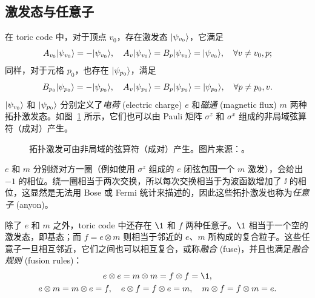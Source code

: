 \subsection{激发态与任意子}

在 toric code 中，对于顶点 $v_0$，存在激发态 $\ket*{\psi_{v_0}}$，它满足
\begin{equation}
  A_{v_0} \ket*{\psi_{v_0}} = -\ket*{\psi_{v_0}}, \quad
  A_v \ket*{\psi_{v_0}} = B_p \ket*{\psi_{v_0}} = \ket*{\psi_{v_0}}, \quad \forall v \neq v_0, p;
\end{equation}
同样，对于元格 $p_0$，也存在 $\ket*{\psi_{p_0}}$，满足
\begin{equation}
  B_{p_0} \ket*{\psi_{p_0}} = -\ket*{\psi_{p_0}}, \quad
  A_v \ket*{\psi_{p_0}} = B_p \ket*{\psi_{p_0}} = \ket*{\psi_{p_0}}, \quad \forall p \neq p_0, v.
\end{equation}
$\ket*{\psi_{v_0}}$ 和 $\ket*{\psi_{p_0}}$ 分别定义了\emph{电荷} (electric charge) $e$ 和\emph{磁通} (magnetic flux) $m$ 两种拓扑激发态。如图~\ref{fig:toric-code-string-operators} 所示，它们也可以由 Pauli 矩阵 $\sigma^z$ 和 $\sigma^x$ 组成的非局域弦算符（成对）产生。

\begin{figure}[htb]
  \centering
  \caption[弦算符产生拓扑激发]{拓扑激发可由非局域的弦算符（成对）产生。图片来源：\parencite{kong2022invitation}。}
  \label{fig:toric-code-string-operators}
\end{figure}

$e$ 和 $m$ 分别绕对方一圈（例如使用 $\sigma^z$ 组成的 $e$ 闭弦包围一个 $m$ 激发），会给出 $-1$ 的相位。绕一圈相当于两次交换，所以每次交换相当于为波函数增加了 $\ii$ 的相位，这显然是无法用 Bose 或 Fermi 统计来描述的，因此这些拓扑激发也称为\emph{任意子} (anyon)。

除了 $e$ 和 $m$ 之外，toric code 中还存在 $\1$ 和 $f$ 两种任意子。$\1$ 相当于一个空的激发态，即基态；而 $f=e\otimes m$ 则相当于邻近的 $e$、$m$ 所构成的复合粒子。这些任意子一旦相互邻近，它们之间也可以相互复合，或称\emph{融合} (fuse)，并且也满足\emph{融合规则} (fusion rules)：
\begin{equation}
  \begin{gathered}
    e \otimes e = m \otimes m = f \otimes f = \1, \\
    e \otimes m = m \otimes e = f, \quad
    e \otimes f = f \otimes e = m, \quad
    m \otimes f = f \otimes m = e.
  \end{gathered}
\end{equation}

